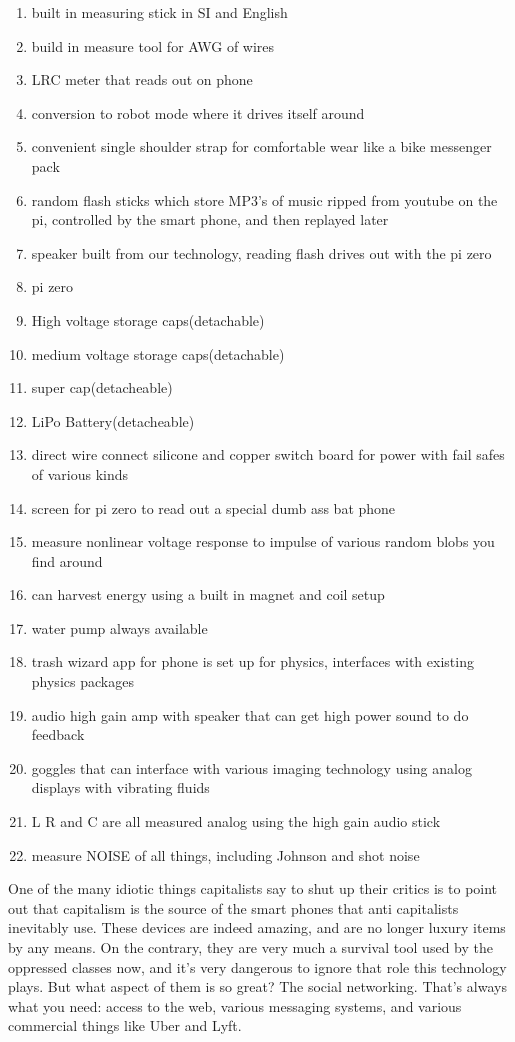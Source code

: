 \begin{enumerate}
\def\labelenumi{\arabic{enumi}.}
\tightlist
\item
  built in measuring stick in SI and English
\item
  build in measure tool for AWG of wires
\item
  LRC meter that reads out on phone
\item
  conversion to robot mode where it drives itself around
\item
  convenient single shoulder strap for comfortable wear like a bike
  messenger pack
\item
  random flash sticks which store MP3's of music ripped from youtube on
  the pi, controlled by the smart phone, and then replayed later
\item
  speaker built from our technology, reading flash drives out with the
  pi zero
\item
  pi zero
\item
  High voltage storage caps(detachable)
\item
  medium voltage storage caps(detachable)
\item
  super cap(detacheable)
\item
  LiPo Battery(detacheable)
\item
  direct wire connect silicone and copper switch board for power with
  fail safes of various kinds
\item
  screen for pi zero to read out a special dumb ass bat phone
\item
  measure nonlinear voltage response to impulse of various random blobs
  you find around
\item
  can harvest energy using a built in magnet and coil setup
\item
  water pump always available
\item
  trash wizard app for phone is set up for physics, interfaces with
  existing physics packages
\item
  audio high gain amp with speaker that can get high power sound to do
  feedback
\item
  goggles that can interface with various imaging technology using
  analog displays with vibrating fluids
\item
  L R and C are all measured analog using the high gain audio stick
\item
  measure NOISE of all things, including Johnson and shot noise
\end{enumerate}

One of the many idiotic things capitalists say to shut up their critics
is to point out that capitalism is the source of the smart phones that
anti capitalists inevitably use. These devices are indeed amazing, and
are no longer luxury items by any means. On the contrary, they are very
much a survival tool used by the oppressed classes now, and it's very
dangerous to ignore that role this technology plays. But what aspect of
them is so great? The social networking. That's always what you need:
access to the web, various messaging systems, and various commercial
things like Uber and Lyft.

